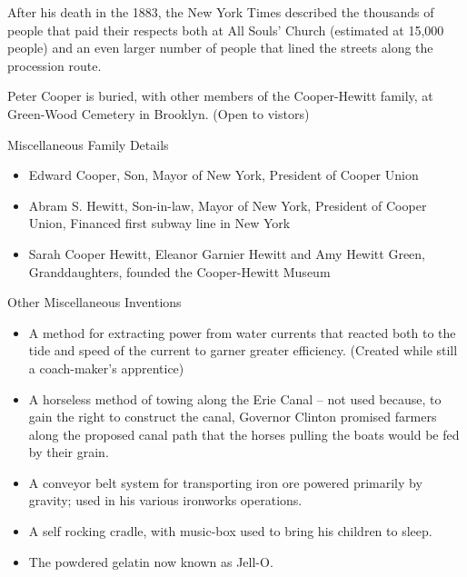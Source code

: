 \documentclass{article}
\begin{document}
\begin{minipage}[t]{0.46\linewidth}
\begin{enumList}
\item After his death in the 1883, the New York Times described the {\mdseries
thousands of people that paid their respects} both at All Souls' Church
(estimated at 15,000 people) and an even larger number of people that lined
the streets along the procession route.

\item Peter Cooper is buried, with other members of the Cooper-Hewitt family,
at {\mdseries Green-Wood Cemetery} in Brooklyn. (Open to vistors)

\setcounter{enumTemp}{\value{enumListi}}
\end{enumList}
\end{minipage}\hfill
\begin{minipage}[t]{0.46\linewidth}
\fontsize{11pt}{13pt}\selectfont
\raggedright
\upshape
\begin{enumList}
\setcounter{enumListi}{\value{enumTemp}}

\item Miscellaneous Family Details
\begin{itemize}[leftmargin=*]
\item Edward Cooper, Son, Mayor of New York, President of Cooper Union
\item Abram S. Hewitt, Son-in-law, Mayor of New York, President of Cooper Union,
Financed first subway line in New York
\item Sarah Cooper Hewitt, Eleanor Garnier Hewitt and Amy Hewitt Green,
Granddaughters, founded the Cooper-Hewitt Museum
\end{itemize}

\item Other Miscellaneous Inventions
\begin{itemize}[leftmargin=*]
\item A method for extracting power from water currents that reacted both to the
tide and speed of the current to garner greater efficiency. (Created while
still a coach-maker's apprentice)
\item A horseless method of towing along the Erie Canal -- not used because, to gain the right to construct the canal, Governor Clinton promised
farmers along the proposed canal path that the horses pulling the boats would be fed by their grain.
\item A conveyor belt system for transporting iron ore powered
primarily by gravity; used in his various ironworks operations.
\item A self rocking cradle, with music-box used to bring his children to sleep.
\item The powdered gelatin now known as Jell-O.
\end{itemize}
\end{enumList}


\end{minipage}
\end{document}

